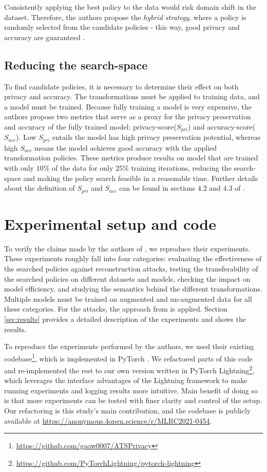 Consistently applying the best policy to the data would risk domain shift in the dataset. Therefore, the authors propose the \emph{hybrid strategy}, where a policy is randomly selected from the candidate policies - this way, good privacy and accuracy are guaranteed \cite{gao2021privacy}.

\subsection{Reducing the search-space}
\label{sec:3.2search}

To find candidate policies, it is necessary to determine their effect on both privacy and accuracy. The transformations must be applied to training data, and a model must be trained. Because fully training a model is very expensive, the authors propose two metrics that serve as a proxy for the privacy preservation and accuracy of the fully trained model: privacy-score($S_{pri}$) and accuracy-score($S_{acc}$). Low $S_{pri}$ entails the model has high privacy preservation potential, whereas high $S_{acc}$ means the model achieves good accuracy with the applied transformation policies. These metrics produce results on model that are trained with only $10\%$ of the data for only $25\%$ training iterations, reducing the search-space and making the policy search feasible in a reasonable time. Further details about the definition of $S_{pri}$ and $S_{acc}$ can be found in sections $4.2$ and $4.3$ of \cite{gao2021privacy}.

\section{Experimental setup and code}

To verify the claims made by the authors of \cite{gao2021privacy}, we reproduce their experiments. These experiments roughly fall into four categories: evaluating the effectiveness of the searched policies against reconstruction attacks, testing the transferability of the searched policies on different datasets and models, checking the impact on model efficiency, and studying the semantics behind the different transformations. Multiple models must be trained on augmented and un-augmented data for all these categories. For the attacks, the approach from \cite{geiping2020inverting} is applied. Section \ref{sec:results} provides a detailed description of the experiments and shows the results.

To reproduce the experiments performed by the authors, we used their existing codebase\footnote{\url{https://github.com/gaow0007/ATSPrivacy}}, which is implemented in PyTorch \cite{pytorch2019}. We refactored parts of this code and re-implemented the rest to our own version written in PyTorch Lightning\footnote{\url{https://github.com/PyTorchLightning/pytorch-lightning}}, which leverages the interface advantages of the Lightning framework to make running experiments and logging results more intuitive. Main benefit of doing so is that more experiments can be tested with finer clarity and control of the setup. Our refactoring is this study's main contribution, and the codebase is publicly available at \url{https://anonymous.4open.science/r/MLRC2021-0454}.

